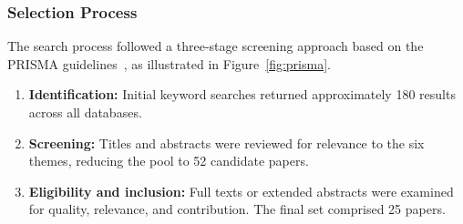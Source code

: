 \documentclass[12pt,a4paper]{article}
\begin{document}
\subsubsection{Selection Process}
\label{sec:selection-process}

The search process followed a three-stage screening approach based on the PRISMA guidelines~\cite{moher2009prisma}, as illustrated in Figure~\ref{fig:prisma}.

\begin{enumerate}[leftmargin=2em]
    \item \textbf{Identification:} Initial keyword searches returned approximately 180 results across all databases.
    \item \textbf{Screening:} Titles and abstracts were reviewed for relevance to the six themes, reducing the pool to 52 candidate papers.
    \item \textbf{Eligibility and inclusion:} Full texts or extended abstracts were examined for quality, relevance, and contribution. The final set comprised 25 papers.
\end{enumerate}
\end{document}
